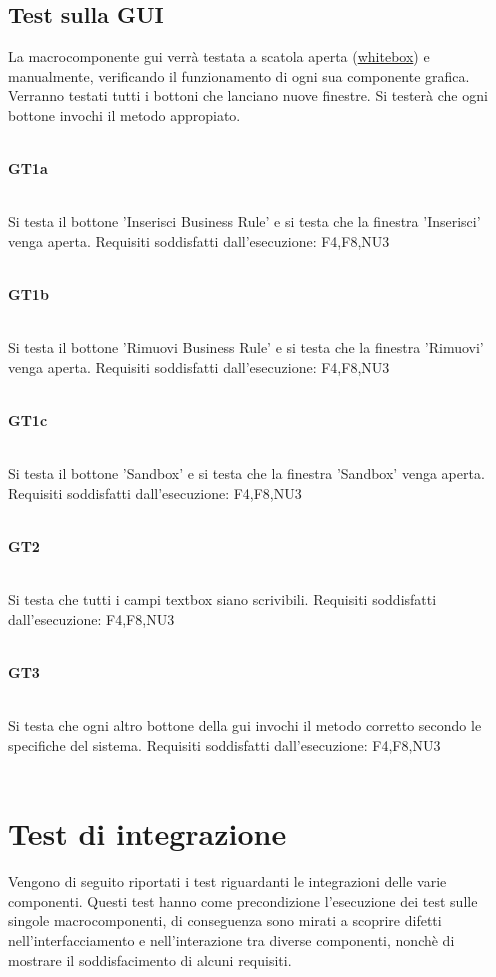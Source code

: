 \subsection{Test sulla GUI}
La macrocomponente gui verr\`a testata a scatola aperta (\underline{whitebox}) e manualmente, verificando il funzionamento di ogni sua componente grafica. Verranno testati tutti i bottoni che lanciano nuove finestre. Si tester\`a che ogni bottone invochi il metodo appropiato.\\
\\
\begin{Large}\textbf{GT1a}\end{Large} \\
Si testa il bottone 'Inserisci Business Rule' e si testa che la finestra 'Inserisci' venga aperta.
Requisiti soddisfatti dall'esecuzione: F4,F8,NU3 \\
 \\
\begin{Large}\textbf{GT1b}\end{Large} \\
Si testa il bottone 'Rimuovi Business Rule' e si testa che la finestra 'Rimuovi' venga aperta.
Requisiti soddisfatti dall'esecuzione: F4,F8,NU3\\
 \\
\begin{Large}\textbf{GT1c}\end{Large} \\
Si testa il bottone 'Sandbox' e si testa che la finestra 'Sandbox' venga aperta.
Requisiti soddisfatti dall'esecuzione: F4,F8,NU3\\
 \\
\begin{Large}\textbf{GT2}\end{Large} \\
Si testa che tutti i campi textbox siano scrivibili.
Requisiti soddisfatti dall'esecuzione: F4,F8,NU3\\
 \\
\begin{Large}\textbf{GT3}\end{Large} \\
Si testa che ogni altro bottone della gui invochi il metodo corretto secondo le specifiche del sistema.
Requisiti soddisfatti dall'esecuzione: F4,F8,NU3\\
 \\
\section{Test di integrazione}
Vengono di seguito riportati i test riguardanti le integrazioni delle varie componenti. Questi test hanno come precondizione l'esecuzione dei test sulle singole macrocomponenti, di conseguenza sono mirati a scoprire difetti nell'interfacciamento e nell'interazione tra diverse componenti, nonch\`e di mostrare il soddisfacimento di alcuni requisiti.

